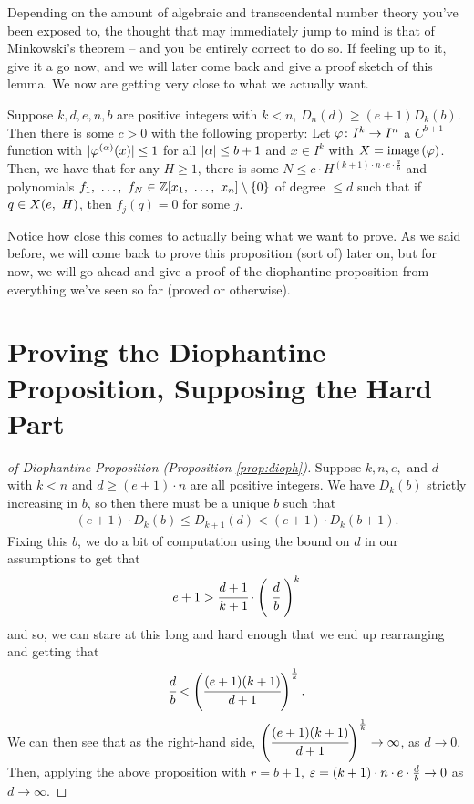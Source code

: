 Depending on the amount of algebraic and transcendental number theory you've been exposed to, the thought that may immediately jump to mind is that of Minkowski's theorem -- and you be entirely correct to do so. If feeling up to it, give it a go now, and we will later come back and give a proof sketch of this lemma. We now are getting very close to what we actually want.


\begin{proposition}
  Suppose $k, d, e, n, b$ are positive integers with $k < n$, $D_n(d) \geq (e + 1) D_k(b)$. Then there is some $c > 0$ with the following property: Let $\varphi \colon I^k \to I^n$ a $C^{b + 1}$ function with $\vert\varphi^{(\alpha)}(x)\vert \leq 1$ for all $\vert\alpha\vert \leq b + 1$ and $x \in I^{k}$ with $X = \operatorname{image}\left(\varphi\right)$. Then, we have that for any $H \geq 1$, there is some $N \leq c \cdot H^{(k+1) \cdot n \cdot e \cdot \frac{d}{b}}$ and polynomials $f_1, \ \hdots, \ f_{N} \in \mathbb{Z}[x_1, \ \hdots, \ x_{n}] \setminus \{ 0 \}$ of degree $\leq d$ such that if $q \in X(e, \ H)$, then $f_j(q) = 0$ for some $j$.
  \label{prop:pre_dioph}
\end{proposition}

Notice how close this comes to actually being what we want to prove. As we said before, we will come back to prove this proposition (sort of) later on, but for now, we will go ahead and give a proof of the diophantine proposition from everything we've seen so far (proved or otherwise).

\section{Proving the Diophantine Proposition, Supposing the Hard Part}

\begin{proof}[of Diophantine Proposition (Proposition \ref{prop:dioph})]
  Suppose $k, n, e, $ and $d$ with $k < n$ and $d \geq (e + 1) \cdot n$ are all positive integers. We have $D_k(b)$ strictly increasing in $b$, so then there must be a unique $b$ such that
    \begin{align*}
     (e + 1) \cdot D_k(b) \leq D_{k + 1}(d) < (e + 1) \cdot D_k(b + 1).
   \end{align*}
  Fixing this $b$, we do a bit of computation using the bound on $d$ in our assumptions to get that
    \begin{align*}
      e + 1 > \cfrac{d + 1}{k + 1} \cdot \left( \ \cfrac{d}{b} \ \right)^{k}
    \end{align*}
  and so, we can stare at this long and hard enough that we end up rearranging and getting that
    \begin{align*}
      \cfrac{d}{b} < \left( \cfrac{(e + 1)(k + 1)}{d + 1} \right)^{\frac{1}{k}}.
    \end{align*}
  We can then see that as the right-hand side, $\left( \cfrac{(e + 1)(k + 1)}{d + 1} \right)^{\frac{1}{k}} \to \infty$, as $d \to 0$. Then, applying the above proposition with $r = b+1$, $\varepsilon = (k+1) \cdot n \cdot e \cdot \frac{d}{b} \to 0$ as $d \to \infty$.
\end{proof}

